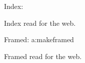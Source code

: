 \documentclass{article}
\begin{document}
Index: \ownprimindex
\ifdefined\printindex\par Index read for the web.\fi\par
Framed: \ownprimframed
\expandafter\ifx\csname a:makeframed\endcsname\relax\else\par Framed read for the web.\fi
\end{document}
